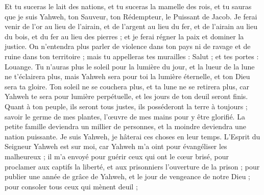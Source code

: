 \begin{multicols}{2}
Et tu suceras le lait des nations, et tu suceras la mamelle des rois, et tu sauras que je suis Yahweh, ton Sauveur, ton Rédempteur, le Puissant de Jacob.
Je ferai venir de l'or au lieu de l'airain, et de l'argent au lieu du fer, et de l'airain au lieu du bois, et du fer au lieu des pierres ; et je ferai régner la paix et dominer la justice.
On n'entendra plus parler de violence dans ton pays ni de ravage et de ruine dans ton territoire ; mais tu appelleras tes murailles : Salut ; et tes portes : Louange.
Tu n'auras plus le soleil pour la lumière du jour, et la lueur de la lune ne t'éclairera plus, mais Yahweh sera pour toi la lumière éternelle, et ton Dieu sera ta gloire.
Ton soleil ne se couchera plus, et ta lune ne se retirera plus, car Yahweh te sera pour lumière perpétuelle, et les jours de ton deuil seront finis.
Quant à ton peuple, ils seront tous justes, ils posséderont la terre à toujours ; savoir le germe de mes plantes, l'œuvre de mes mains pour y être glorifié.
La petite famille deviendra un millier de personnes, et la moindre deviendra une nation puissante. Je suis Yahweh, je hâterai ces choses en leur temps.
\VerseOne{}L'Esprit du Seigneur Yahweh est sur moi, car Yahweh m'a oint pour évangéliser les malheureux ; il m'a envoyé pour guérir ceux qui ont le cœur brisé, pour proclamer aux captifs la liberté, et aux prisonniers l'ouverture de la prison ;
pour publier une année de grâce de Yahweh, et le jour de vengeance de notre Dieu ; pour consoler tous ceux qui mènent deuil ;

\end{multicols}

